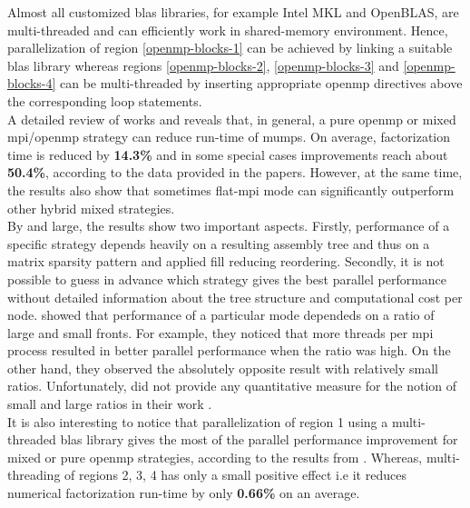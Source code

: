 Almost all customized \gls{blas} libraries, for example Intel MKL and OpenBLAS, are multi-threaded and can efficiently work in shared-memory environment. Hence, parallelization of region \ref{openmp-blocks-1} can be achieved by linking a suitable \gls{blas} library whereas regions \ref{openmp-blocks-2}, \ref{openmp-blocks-3} and \ref{openmp-blocks-4} can be multi-threaded by inserting appropriate \gls{openmp} directives above the corresponding loop statements.\\


A detailed review of works \cite{l2013introduction} and \cite{chowdhury2010some} reveals that, in general, a pure \gls{openmp} or mixed \gls{mpi}/\gls{openmp} strategy can reduce run-time of \gls{mumps}. On average, factorization time is reduced by \textbf{14.3\%} and in some special cases improvements reach about \textbf{50.4\%}, according to the data provided in the papers. However, at the same time, the results also show that sometimes flat-\gls{mpi} mode can significantly outperform other hybrid mixed strategies.\\


By and large, the results show two important aspects. Firstly, performance of a specific strategy depends heavily on a resulting assembly tree and thus on a matrix sparsity pattern and applied fill reducing reordering. Secondly, it is not possible to guess in advance which strategy gives the best parallel performance without detailed information about the tree structure and computational cost per node. \citeauthor{l2013introduction} showed that performance of a particular mode dependeds on a ratio of large and small fronts. For example, they noticed that more threads per \gls{mpi} process resulted in better parallel performance when the ratio was high. On the other hand, they observed the absolutely opposite result with relatively small ratios. Unfortunately, \citeauthor{l2013introduction} did not provide any quantitative measure for the notion of small and large ratios in their work \cite{l2013introduction}.\\ 


It is also interesting to notice that parallelization of region 1 using a multi-threaded \gls{blas} library gives the most of the parallel performance improvement for mixed or pure \gls{openmp} strategies, according to the results from \cite{l2013introduction}. Whereas,
multi-threading of regions 2, 3, 4 has only a small positive effect i.e it reduces numerical factorization run-time by only \textbf{0.66\%} on an average.\\



